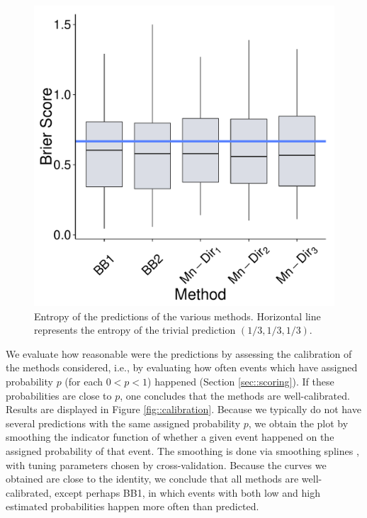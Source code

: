 \documentclass[journal,article,accept,moreauthors,pdftex,12pt,a4paper]{mdpi}
\begin{document}
\begin{figure}[H]
  \centering
\includegraphics[page=10,scale=0.3]{futebolComparacaoModelosForPaper.pdf}
  \caption{Entropy of the predictions of the various methods. Horizontal line represents the entropy of the trivial prediction $(1/3,1/3,1/3)$.}
  \label{fig::entropy}
\end{figure}


We evaluate how reasonable were the predictions by assessing the calibration of the methods considered, i.e., by evaluating how often events which have assigned probability $p$ (for each $0<p<1$) happened (Section \ref{sec::scoring}).
If these probabilities are close to $p$, one concludes that the methods are well-calibrated. 
Results are displayed in Figure \ref{fig::calibration}.
Because we typically do not have several predictions with the same assigned probability $p$, we obtain the plot by smoothing the indicator function of whether a given event happened on  the assigned  probability of that event. 
The smoothing is done via smoothing splines \cite{wahba}, with tuning parameters chosen by cross-validation.
Because the curves we obtained are close to the identity, we conclude that all methods are well-calibrated, except perhaps BB1, in which events with both low and high estimated probabilities happen more often 
than predicted.
\end{document}
